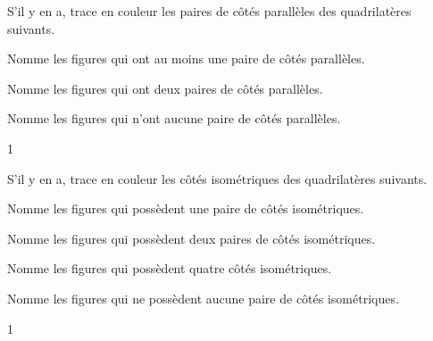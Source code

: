 \documentclass[a4paper,11pt]{report}
\begin{document}
\begin{exop}{
\begin{tasks}
    \task S'il y en a, trace en couleur les paires de côtés parallèles des quadrilatères suivants.
\vspace{-0.2cm}
    \begin{center}
    
    \end{center}
    
    \task Nomme les figures qui ont au moins une paire de côtés parallèles.  


    \task Nomme les figures qui ont deux paires de côtés parallèles.


    \task Nomme les figures qui n'ont aucune paire de côtés parallèles.  

\end{tasks}
    
}{1}
\end{exop}

\begin{exop}{
\begin{tasks}
    \task S'il y en a, trace en couleur les côtés isométriques des quadrilatères suivants. 
	    \vspace{-0.3cm}
    \begin{center}
    
    \end{center}
    \vspace{-0.6cm}
    
    \task Nomme les figures qui possèdent une paire de côtés isométriques. 


    \task Nomme les figures qui possèdent deux paires de côtés isométriques. 


    \task Nomme les figures qui possèdent quatre côtés isométriques. 

    
    \task Nomme les figures qui ne possèdent aucune paire de côtés isométriques. 


\end{tasks}
    
}{1}
\end{exop}
\end{document}
